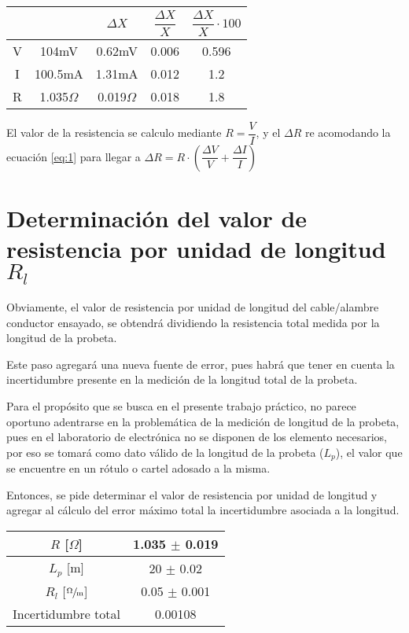 \begin{center}\tabulinesep=1.2mm\begin{tabu}{cc|c|c|c|}
                             &               & $\Delta X$    & $\dfrac{\Delta X}{X}$ & $\dfrac{\Delta X}{X} \cdot 100$ \\ \hline
      & 104mV         & 0.62mV        & 0.006                 & 0.596 \\ \hline
      & 100.5mA       & 1.31mA        & 0.012                 & 1.2 \\ \hline
      & 1.035$\Omega$ & 0.019$\Omega$ & 0.018                 & 1.8 \\ \hline
\end{tabu}\end{center}

El valor de la resistencia se calculo mediante $R = \dfrac{V}{I}$, y el $\Delta R$ re acomodando la ecuación \ref{eq:1} para llegar a $\Delta R = R \cdot \left( \dfrac{\Delta V}{V} + \dfrac{\Delta I}{I} \right)$

\section{Determinación del valor de resistencia por unidad de longitud $R_l$}
Obviamente, el valor de resistencia por unidad de longitud del cable/alambre conductor ensayado, se obtendrá dividiendo la resistencia total medida por la longitud de la probeta.

Este paso agregará una nueva fuente de error, pues habrá que tener en cuenta la incertidumbre presente en la medición de la longitud total de la probeta.

Para el propósito que se busca en el presente trabajo práctico, no parece oportuno adentrarse en la problemática de la medición de longitud de la probeta, pues en el laboratorio de electrónica no se disponen de los elemento necesarios, por eso se tomará como dato válido de la longitud de la probeta ($L_p$), el valor que se encuentre en un rótulo o cartel adosado a la misma.

Entonces, se pide determinar el valor de resistencia por unidad de longitud y agregar al cálculo del error máximo total la incertidumbre asociada a la longitud.

\begin{center}\tabulinesep=1.2mm\begin{tabu}{|c|c|}
  \hline
  $R$ [$\Omega$] & 1.035 $\pm$ 0.019\\ \hline
  $L_p$ [m] & 20 $\pm$ 0.02 \\ \hline
  $R_l$ [$\sfrac{\Omega}{\text{m}}$] & 0.05 $\pm$ 0.001 \\ \hline
  Incertidumbre total & 0.00108 \\ \hline
\end{tabu}\end{center}

